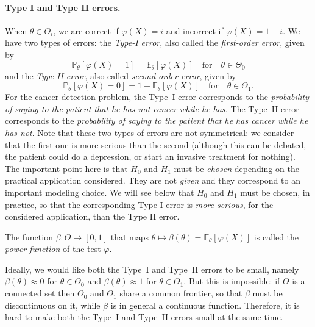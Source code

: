 \documentclass[
	fontsize=11pt, %
	twoside=false, %
	numbers=noenddot, %
]{kaobook}
\renewcommand{\P}{\mathbb P}
\newcommand{\E}{\mathbb E}
\newcommand{\goes}{\rightarrow}
\begin{document}
\paragraph{Type I and Type II errors.}

When $\theta \in \Theta_i$, we are correct if $\varphi(X) = i$ and incorrect if $\varphi(X) = 1 - i$.
We have two types of errors: the \emph{Type-I error}, also called the \emph{first-order error}, given by 
\begin{equation}
	\label{eq:type-1-error}
	\P_\theta[ \varphi(X) = 1] = \E_\theta [\varphi(X)] \quad \text{for} \quad
	\theta \in \Theta_0
\end{equation}
and the \emph{Type-II error}, also called \emph{second-order error}, given by 
\begin{equation}
	\label{eq:type-2-error}
	\P_\theta[ \varphi(X) = 0] = 1 - \E_\theta [\varphi(X)] \quad \text{for} \quad 
	\theta \in \Theta_1.
\end{equation}
For the cancer detection problem, the Type~I error corresponds to the \emph{probability of saying to the patient that he has not cancer while he has.}
The Type~II error corresponds to the \emph{probability of saying to the patient that he has cancer while he has not}.
Note that these two types of errors are not symmetrical: we consider that the first one is more serious than the second (although this can be debated, the patient could do a depression, or start an invasive treatment for nothing).%
The important point here is that $H_0$ and $H_1$ must be \emph{chosen} depending on the practical application considered. 
They are not \emph{given} and they correspond to an important modeling choice.
We will see below that $H_0$ and $H_1$ must be chosen, in practice, so that the corresponding Type I error is \emph{more serious}, for the considered application, than the Type II error.
\begin{definition}
	\label{def:power-function}
	The function $\beta : \Theta \goes [0, 1]$ that maps $\theta \mapsto \beta(\theta) = \E_\theta [\varphi(X)]$ is called the \emph{power function} of the test $\varphi$.
\end{definition}
Ideally, we would like both the Type~I and Type~II errors to be small, namely $\beta(\theta) \approx 0$ for $\theta \in \Theta_0$ and $\beta(\theta) \approx 1$ for $\theta \in \Theta_1$.
But this is impossible: if $\Theta$ is a connected set then $\Theta_0$ and $\Theta_1$ share a common frontier, so that $\beta$ must be discontinuous on it, while $\beta$ is in general a continuous function.
Therefore, it is hard to make both the Type~I and Type~II errors small at the same time.
\end{document}
